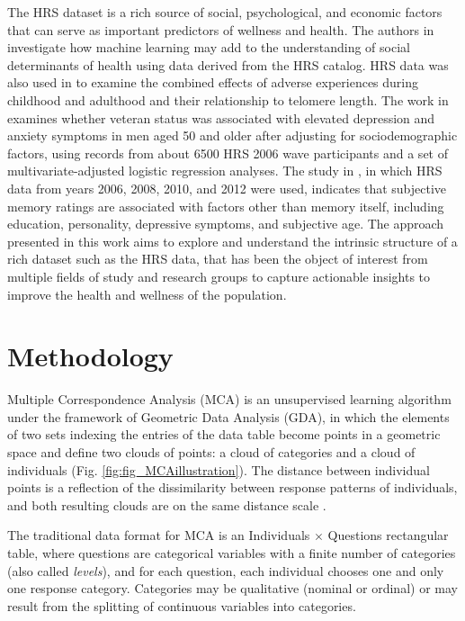 \documentclass[conference,final,]{IEEEtran}
\begin{document}
The HRS dataset is a rich source of social, psychological, and economic
factors that can serve as important predictors of wellness and health.
The authors in \cite{seligman2018machine} investigate how machine
learning may add to the understanding of social determinants of health
using data derived from the HRS catalog. HRS data was also used in
\cite{puterman2016lifespan} to examine the combined effects of adverse
experiences during childhood and adulthood and their relationship to
telomere length. The work in \cite{christine_nodate} examines whether
veteran status was associated with elevated depression and anxiety
symptoms in men aged 50 and older after adjusting for sociodemographic
factors, using records from about 6500 HRS 2006 wave participants and a
set of multivariate-adjusted logistic regression analyses. The study in
\cite{gizem_nodate}, in which HRS data from years 2006, 2008, 2010, and
2012 were used, indicates that subjective memory ratings are associated
with factors other than memory itself, including education, personality,
depressive symptoms, and subjective age. The approach presented in this
work aims to explore and understand the intrinsic structure of a rich
dataset such as the HRS data, that has been the object of interest from
multiple fields of study and research groups to capture actionable
insights to improve the health and wellness of the population.

\hypertarget{methodology}{%
\section{Methodology}\label{methodology}}

Multiple Correspondence Analysis (MCA) is an unsupervised learning
algorithm under the framework of Geometric Data Analysis (GDA), in which
the elements of two sets indexing the entries of the data table become
points in a geometric space and define two clouds of points: a cloud of
categories and a cloud of individuals (Fig.
\ref{fig:fig_MCAillustration}). The distance between individual points
is a reflection of the dissimilarity between response patterns of
individuals, and both resulting clouds are on the same distance scale
\cite{le2010multiple}.

The traditional data format for MCA is an Individuals \(\times\)
Questions rectangular table, where questions are categorical variables
with a finite number of categories (also called \emph{levels}), and for
each question, each individual chooses one and only one response
category. Categories may be qualitative (nominal or ordinal) or may
result from the splitting of continuous variables into categories.
\end{document}
